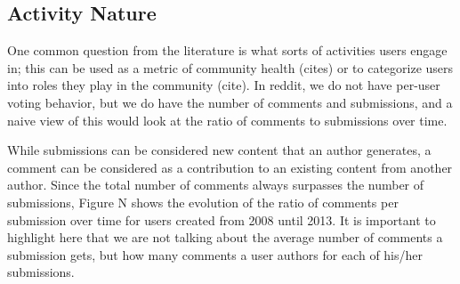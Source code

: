 \subsection{Activity Nature}

One common question from the literature is what sorts of activities users engage in; this can be used as a metric of community health (cites) or to categorize users into roles they play in the community (cite).  In reddit, we do not have per-user voting behavior, but we do have the number of comments and submissions, and a naive view of this would look at the ratio of comments to submissions over time.

While submissions can be considered new content that an author generates, a comment can be considered as a contribution to an existing content from another author. Since the total number of comments always surpasses the number of submissions, Figure N shows the evolution of the ratio of comments per submission over time for users created from 2008 until 2013. It is important to highlight here that we are not talking about the average number of comments a submission gets, but how many comments a user authors for each of his/her submissions.


